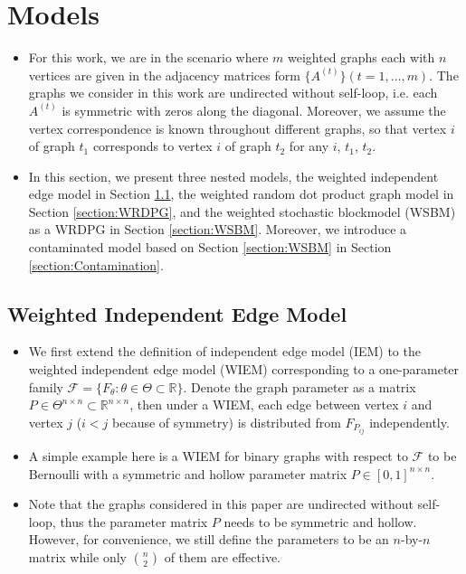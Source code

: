 \documentclass[a4paper]{article}
\begin{document}
\section{Models}
\label{section:model}
\begin{itemize}
\item For this work, we are in the scenario where $m$ weighted graphs each with $n$ vertices are given in the adjacency matrices form $\{ A^{(t)} \} (t = 1, \dotsc, m)$. The graphs we consider in this work are undirected without self-loop, i.e. each $A^{(t)}$ is symmetric with zeros along the diagonal. Moreover, we assume the vertex correspondence is known throughout different graphs, so that vertex $i$ of graph $t_1$ corresponds to vertex $i$ of graph $t_2$ for any $i$, $t_1$, $t_2$.
\item In this section, we present three nested models, the weighted independent edge model in Section \ref{section:WIEM}, the weighted random dot product graph model in Section \ref{section:WRDPG}, and the weighted stochastic blockmodel (WSBM) as a WRDPG in Section \ref{section:WSBM}. Moreover, we introduce a contaminated model based on Section \ref{section:WSBM} in Section \ref{section:Contamination}.
\end{itemize}

\subsection{Weighted Independent Edge Model}
\label{section:WIEM}
\begin{itemize}
\item We first extend the definition of independent edge model (IEM) \cite{bollobas2007phase} to the weighted independent edge model (WIEM) corresponding to a one-parameter family $\mathcal{F} = \{ F_{\theta} : \theta \in \Theta \subset \mathbb{R} \}$. Denote the graph parameter as a matrix $P \in \Theta^{n \times n} \subset \mathbb{R}^{n \times n}$, then under a WIEM, each edge between vertex $i$ and vertex $j$ ($i < j$ because of symmetry) is distributed from $F_{P_{ij}}$ independently.
\item A simple example here is a WIEM for binary graphs with respect to $\mathcal{F}$ to be Bernoulli with a symmetric and hollow parameter matrix $P \in [0, 1]^{n \times n}$.
\item Note that the graphs considered in this paper are undirected without self-loop, thus the parameter matrix $P$ needs to be symmetric and hollow. However, for convenience, we still define the parameters to be an $n$-by-$n$ matrix while only $n \choose 2$ of them are effective.
\end{itemize}
\end{document}
